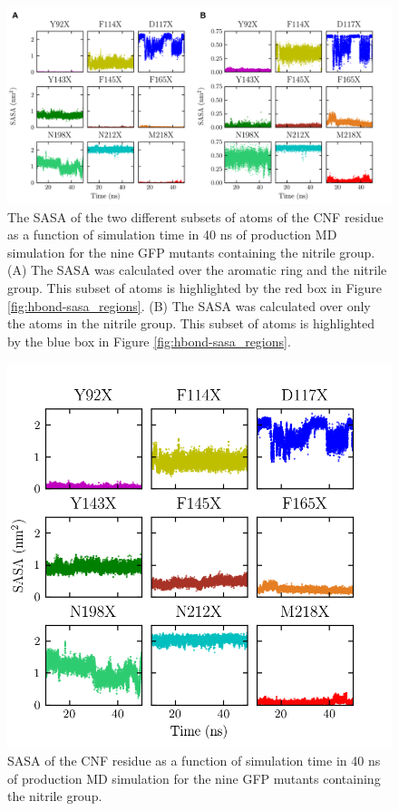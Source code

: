\begin{figure}
    \center
    \includegraphics[width=\double]{figures-gfp-hbond/FigureS1_combined.png}
    \caption[Calculated SASA of smaller subsets of atoms of CNF]{
        The SASA of the two different subsets of atoms of the CNF residue as a function of simulation time in 40 ns of production MD simulation for the nine GFP mutants containing the nitrile group. 
        (A) The SASA was calculated over the aromatic ring and the nitrile group. 
        This subset of atoms is highlighted by the red box in Figure \ref{fig:hbond-sasa_regions}. 
        (B) The SASA was calculated over only the atoms in the nitrile group. 
        This subset of atoms is highlighted by the blue box in Figure \ref{fig:hbond-sasa_regions}.
    }
    \label{fig:hbond-sasa_regions_v_time}
\end{figure}

\begin{figure}
    \center
    \includegraphics[width=\single]{figures-gfp-hbond/sasa_v_time.png}
    \caption[Calculated SASA of entire CNF residue over the course of the MD simulation]{
        SASA of the CNF residue as a function of simulation time in 40 ns of production MD simulation for the nine GFP mutants containing the nitrile group.
    }
    \label{fig:hbond-sasa}
\end{figure}

